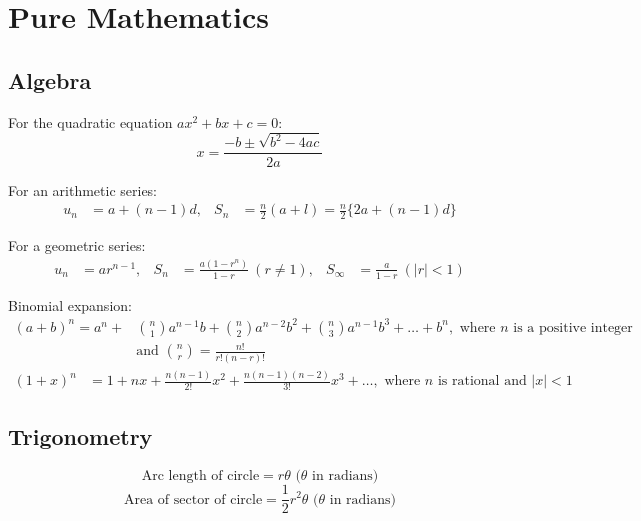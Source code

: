 \documentclass[../"Formula sheet.tex"]{subfiles}
\begin{document}
\section{Pure Mathematics}

\subsection{Algebra}
\quad \enspace{}For the quadratic equation \(ax^2+bx+c=0\):
\begin{equation}
    x=\frac{-b \pm \sqrt{b^2-4ac}}{2a}
\end{equation}

For an arithmetic series:
\begin{align}
    u_n&=a+(n-1)d,     &  S_n&=\frac{n}{2}(a+l) = \frac{n}{2}\{2a+(n-1)d\}
\end{align}

For a geometric series:
\begin{align}
    u_n&=ar^{n-1}, & S_n&=\frac{a(1-r^n)}{1-r} \ (r \neq 1), & S_\infty &=\frac{a}{1-r} \ (|r| < 1)
\end{align}

Binomial expansion:
\begin{align}
    (a + b)^n = a^n + & \binom{n}{1} a^{n-1} b + \binom{n}{2} a^{n-2} b^2 + \binom{n}{3} a^{n-1} b^3 + \dots + b^n, \text{ where \(n\) is a positive integer} \\
    &\text{and } \binom{n}{r}=\frac{n!}{r!(n-r)!}
\end{align}
\begin{align}
    (1 + x)^n &= 1 + nx + \frac{n(n-1)}{2!} x^2 + \frac{n(n-1)(n-2)}{3!} x^3 + \dots, \text{ where \(n\) is rational and \(|x|<1\)}
\end{align}

\subsection{Trigonometry}
\begin{equation}
    \text{Arc length of circle} =r\theta \text{ (\(\theta\) in radians)}
\end{equation}
\begin{equation}
    \text{Area of sector of circle} =\frac{1}{2}r^2 \theta \text{ (\(\theta\) in radians)}
\end{equation}
\end{document}
